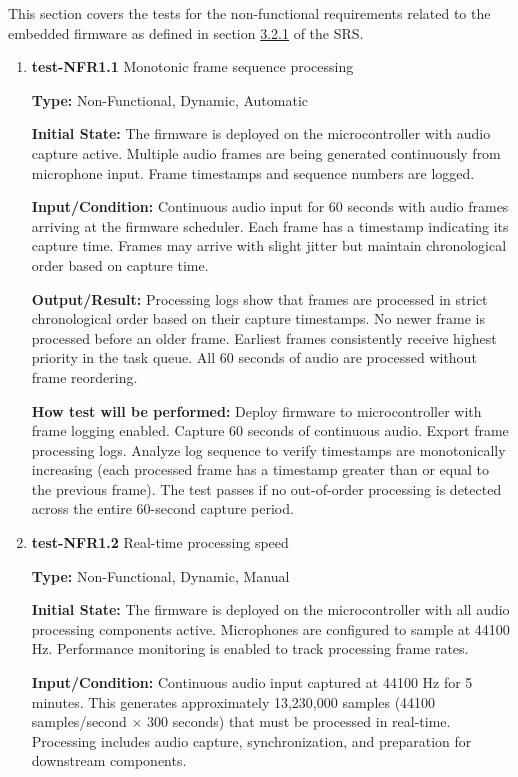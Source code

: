 \documentclass[12pt, titlepage]{article}
\begin{document}
This section covers the tests for the non-functional requirements related to the 
embedded firmware as defined in section \hyperref[SRS-sec:FR1]{3.2.1} of the SRS.

\begin{enumerate}

\item{\textbf{test-NFR1.1} Monotonic frame sequence processing\\}

\textbf{Type:} Non-Functional, Dynamic, Automatic
					
\textbf{Initial State:} 
The firmware is deployed on the microcontroller with audio capture active. 
Multiple audio frames are being generated continuously from microphone input. 
Frame timestamps and sequence numbers are logged.
					
\textbf{Input/Condition:} 
Continuous audio input for 60 seconds with audio frames arriving at the firmware 
scheduler. Each frame has a timestamp indicating its capture time. Frames may 
arrive with slight jitter but maintain chronological order based on capture time.
					
\textbf{Output/Result:} 
Processing logs show that frames are processed in strict chronological order 
based on their capture timestamps. No newer frame is processed before an older 
frame. Earliest frames consistently receive highest priority in the task queue. 
All 60 seconds of audio are processed without frame reordering.
					
\textbf{How test will be performed:} 
Deploy firmware to microcontroller with frame logging enabled. Capture 60 seconds 
of continuous audio. Export frame processing logs. Analyze log sequence to verify 
timestamps are monotonically increasing (each processed frame has a timestamp 
greater than or equal to the previous frame). The test passes if no out-of-order 
processing is detected across the entire 60-second capture period.
					
\item{\textbf{test-NFR1.2} Real-time processing speed\\}

\textbf{Type:} Non-Functional, Dynamic, Manual
					
\textbf{Initial State:} 
The firmware is deployed on the microcontroller with all audio processing 
components active. Microphones are configured to sample at 44100 Hz. Performance 
monitoring is enabled to track processing frame rates.
					
\textbf{Input/Condition:} 
Continuous audio input captured at 44100 Hz for 5 minutes. This generates 
approximately 13,230,000 samples (44100 samples/second × 300 seconds) that must 
be processed in real-time. Processing includes audio capture, synchronization, 
and preparation for downstream components.
					

\end{enumerate}
\end{document}
